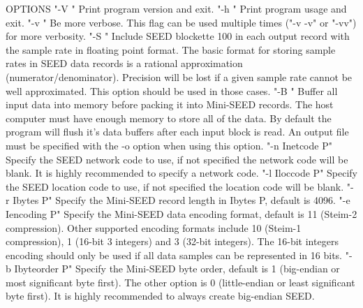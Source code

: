 OPTIONS \newline
"-V " \newline
Print program version and exit. \newline
"-h " \newline
Print program usage and exit. \newline
"-v " \newline
Be more verbose. This flag can be used multiple times ("-v -v" or "-vv") for more verbosity. \newline
"-S " \newline
Include SEED blockette 100 in each output record with the sample rate in floating point format. The basic format for storing sample rates in SEED data records is a rational approximation (numerator/denominator). Precision will be lost if a given sample rate cannot be well approximated. This option should be used in those cases. 
\newline
"-B " \newline
Buffer all input data into memory before packing it into Mini-SEED records. The host computer must have enough memory to store all of the data. By default the program will flush it's data buffers after each input block is read. An output file must be specified with the -o option when using this option. \newline
"-n Inetcode P" \newline
Specify the SEED network code to use, if not specified the network code will be blank. It is highly recommended to specify a network code. \newline
"-l Iloccode P" \newline
Specify the SEED location code to use, if not specified the location code will be blank. \newline
"-r Ibytes P" \newline
Specify the Mini-SEED record length in Ibytes P, default is 4096. \newline
"-e Iencoding P" \newline
Specify the Mini-SEED data encoding format, default is 11 (Steim-2 compression). Other supported encoding formats include 10 (Steim-1 compression), 1 (16-bit 3 integers) and 3 (32-bit integers). The 16-bit integers encoding should only be used if all data samples can be represented in 16 bits. \newline
"-b Ibyteorder P" \newline
Specify the Mini-SEED byte order, default is 1 (big-endian or most significant byte first). The other option is 0 (little-endian or least significant byte first). It is highly recommended to always create big-endian SEED. \newline

